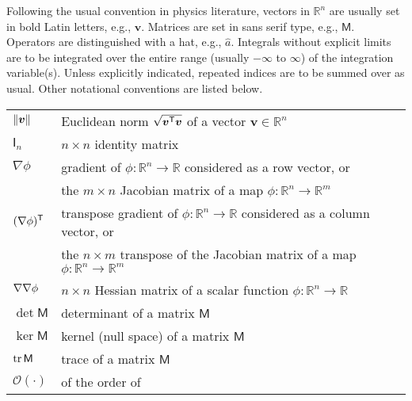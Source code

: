 
Following the usual convention in physics literature, vectors in $\mathbb{R}^{n}$ are usually set in bold Latin letters, e.g., $\bm{v}$.
Matrices are set in \textsf{sans serif} type, e.g., $\mathsf{M}$.
Operators are distinguished with a hat, e.g., $\hat{a}$.
Integrals without explicit limits are to be integrated over the entire range (usually $-\infty$ to $\infty$) of the integration variable(s).
Unless explicitly indicated, repeated indices are to be summed over as usual.
Other notational conventions are listed below.\\

\begin{tabular}{ll}
  $\lVert\bm{v}\rVert$ & Euclidean norm $\sqrt{\bm{v}^\mathsf{T}\bm{v}}$ of a vector $\bm{v} \in \mathbb{R}^{n}$\\
  $\mathsf{I}_n$ & $n\times n$ identity matrix\\
  $\nabla \phi$ & gradient of $\phi: \mathbb{R}^n \to \mathbb{R}$ considered as a row vector, or\\
                & the $m\times n$ Jacobian matrix of a map $\phi: \mathbb{R}^n \to \mathbb{R}^m$\\
  $(\nabla\phi)^\mathsf{T}$ & transpose gradient of $\phi: \mathbb{R}^n \to \mathbb{R}$ considered as a column vector, or\\
                & the $n\times m$ transpose of the Jacobian matrix of a map $\phi: \mathbb{R}^n \to \mathbb{R}^m$\\
  $\nabla\nabla \phi$ & $n\times n$ Hessian matrix of a scalar function $\phi: \mathbb{R}^n \to \mathbb{R}$\\
  $\det\mathsf{M}$ & determinant of a matrix $\mathsf{M}$\\
  $\ker\mathsf{M}$ & kernel (null space) of a matrix $\mathsf{M}$\\
  $\operatorname{tr}\mathsf{M}$ & trace of a matrix $\mathsf{M}$\\
  $\mathcal{O}(\cdot)$ & of the order of
\end{tabular}
